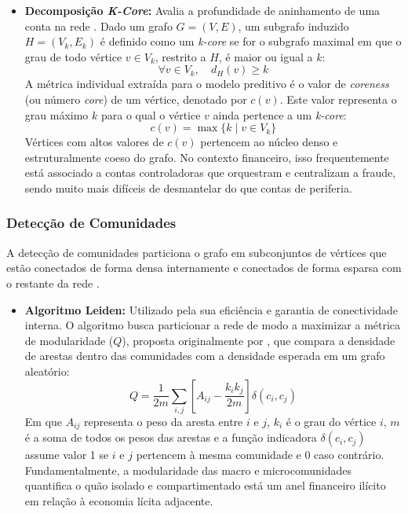 \documentclass[a4paper,12pt,oneside,onecolumn,final,fleqn]{repUERJ}
\begin{document}
\begin{itemize}
\item \textbf{Decomposição \textit{K-Core}:} Avalia a profundidade de aninhamento de uma conta na rede \cite{shin2016corescope, shin2018patterns, conte2024kcores}. Dado um grafo $G = (V, E)$, um subgrafo induzido $H = (V_k, E_k)$ é definido como um \textit{k-core} se for o subgrafo maximal em que o grau de todo vértice $v \in V_k$, restrito a $H$, é maior ou igual a $k$:
\begin{equation}
    \forall v \in V_k, \quad d_H(v) \ge k
\end{equation}
A métrica individual extraída para o modelo preditivo é o valor de \textit{coreness} (ou número \textit{core}) de um vértice, denotado por $c(v)$. Este valor representa o grau máximo $k$ para o qual o vértice $v$ ainda pertence a um \textit{k-core}:
\begin{equation}
    c(v) = \max \{ k \mid v \in V_k \}
\end{equation}
Vértices com altos valores de $c(v)$ pertencem ao núcleo denso e estruturalmente coeso do grafo. No contexto financeiro, isso frequentemente está associado a contas controladoras que orquestram e centralizam a fraude, sendo muito mais difíceis de desmantelar do que contas de periferia.
\end{itemize}

\subsubsection{Detecção de Comunidades}
A detecção de comunidades particiona o grafo em subconjuntos de vértices que estão conectados de forma densa internamente e conectados de forma esparsa com o restante da rede \cite{liu2019evaluation}.
\begin{itemize}
\item \textbf{Algoritmo Leiden:} Utilizado pela sua eficiência e garantia de conectividade interna. O algoritmo busca particionar a rede de modo a maximizar a métrica de modularidade ($Q$), proposta originalmente por , que compara a densidade de arestas dentro das comunidades com a densidade esperada em um grafo aleatório:
\begin{equation}
    Q = \frac{1}{2m} \sum_{i,j} \left[ A_{ij} - \frac{k_i k_j}{2m} \right] \delta(c_i, c_j)
\end{equation}
Em que $A_{ij}$ representa o peso da aresta entre $i$ e $j$, $k_i$ é o grau do vértice $i$, $m$ é a soma de todos os pesos das arestas e a função indicadora $\delta(c_i, c_j)$ assume valor 1 se $i$ e $j$ pertencem à mesma comunidade e 0 caso contrário. Fundamentalmente, a modularidade das macro e microcomunidades quantifica o quão isolado e compartimentado está um anel financeiro ilícito em relação à economia lícita adjacente.
\end{itemize}
\end{document}
